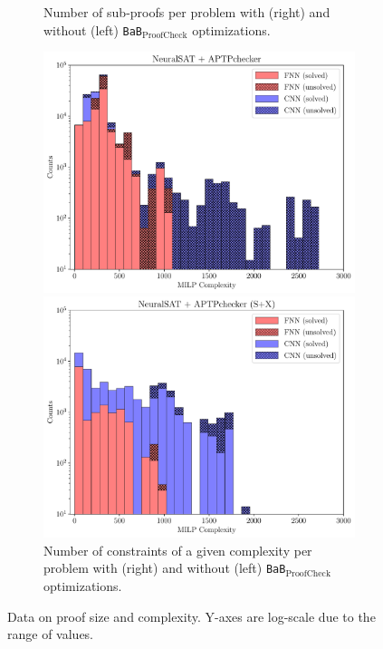 \documentclass[oneside,11pt,dvipsnames]{book}
\newcommand{\proofcheck}{\texttt{BaB$_{\text{ProofCheck}}$}}
\begin{document}
\begin{figure}[t]
\begin{subfigure}{0.4\linewidth}
\begin{minipage}[t]{0.235\textwidth}
    \end{minipage}
    \caption{Number of sub-proofs per problem with (right) and without (left) \proofcheck{} optimizations.}
    \label{fig:sub-proofs-plots}
\end{subfigure}
\hfill
\begin{subfigure}{0.59\linewidth}
    \centering 
    \begin{minipage}[t]{0.5\textwidth}
        \centering  
        \includegraphics[width=\linewidth]{figure/MILP_COMPLEXITY_NONE.pdf}
    \end{minipage}%
    \begin{minipage}[t]{0.5\textwidth}
        \centering  
        \includegraphics[width=\linewidth]{figure/MILP_COMPLEXITY_SX.pdf}
    \end{minipage}

    \caption{Number of constraints of a given complexity per problem with (right) and without (left) \proofcheck{} optimizations.}
    \label{fig:constrs-proofs-plots}
\end{subfigure}
\caption{Data on proof size and complexity.   Y-axes are log-scale due to the range of values.}
\end{figure}
\end{document}
